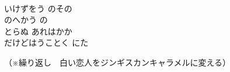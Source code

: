 \documentclass[10pt,b5j]{tarticle} %
\begin{document}
\begin{enumerate}
\begin{minipage}[c]{\blocksize}
        \vspace{\linespace}
        \item~\\
        いけずをう
        のその\\
        のへかう
        の\\
        とらぬ
        あれはかか\\
        だけどはうことく
        にた

        \vspace{\linespace}
        {\footnotesize（※繰り返し　白い恋人をジンギスカンキャラメルに変える）}

    \end{minipage}
\end{enumerate} %
\end{document}
